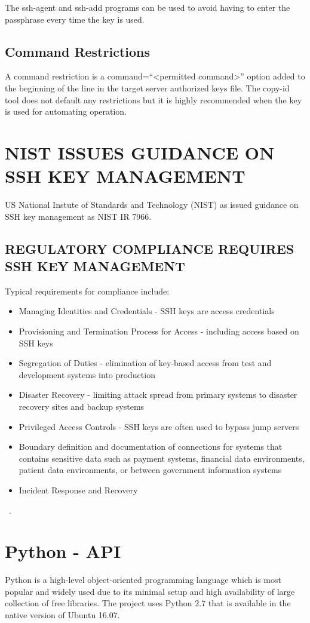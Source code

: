 The ssh-agent and ssh-add programs can be used to avoid having to 
enter the passphrase every time the key is used.

\subsection{Command Restrictions}

A command restriction is a command=``<permitted command>'' option
added to the beginning of the line in the target server authorized
keys file.  The copy-id tool does not default any restrictions but it
is highly recommended when the key is used for automating operation.

\section{NIST ISSUES GUIDANCE ON SSH KEY MANAGEMENT}
US National Instute of Standards and Technology (NIST) as issued guidance on
SSH key management as NIST IR 7966. 

\subsection{REGULATORY COMPLIANCE REQUIRES SSH KEY MANAGEMENT}
Typical requirements for compliance include:
\begin{itemize}
	\item Managing Identities and Credentials - SSH keys 
	are access credentials
	\item Provisioning and Termination Process for Access 
    - including access based on SSH keys
	\item Segregation of Duties - elimination of 
	key-based access from test and development systems into
	production
    \item Disaster Recovery - limiting attack spread
    from primary systems to disaster recovery sites and
    backup systems
    \item Privileged Access Controls - SSH keys are often used to 
    bypass jump servers
    \item Boundary definition and documentation of connections for 
    systems that contains sensitive data such as payment systems,
    financial data environments, patient data 
    environments, or between government information systems
    \item Incident Response and Recovery
\end{itemize}
~\cite{hid-sp18-513-sshkey}.

\section{Python - API}
Python is a high-level object-oriented programming language which 
is most popular and widely used due to its minimal setup and high
availability of large collection of free libraries. The project 
uses Python 2.7 that is available in the native version of 
Ubuntu 16.07.

